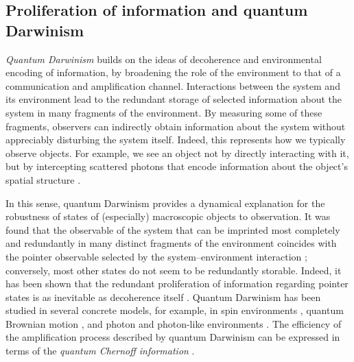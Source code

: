 \documentclass[aps,pra,reprint,amsmath,amssymb,showpacs,nofootinbib,floatfix,onecolumn,12pt]{revtex4-1}
\begin{document}
\subsection{\label{sec:prol-inform-quant}Proliferation of information and quantum Darwinism}

\emph{Quantum Darwinism} \cite{Zurek:2003:pl,Ollivier:2003:za,Ollivier:2004:im,Blume:2004:oo,Blume:2005:oo,Zurek:2009:om,Riedel:2010:un,Riedel:2011:un,Riedel:2012:un} builds on the ideas of decoherence and environmental encoding of information, by broadening the role of the environment to that of a communication and amplification channel. Interactions between the system and its environment lead to the redundant storage of selected information about the system in  many fragments of the environment. By measuring some of these fragments, observers can indirectly obtain information about the system without appreciably disturbing the system itself. Indeed, this represents how we typically observe objects. For example, we see an object not by directly interacting with it, but by intercepting scattered photons that encode information about the object's spatial structure \cite{Riedel:2010:un,Riedel:2011:un}. 

In this sense, quantum Darwinism provides a dynamical explanation for the robustness of states of (especially) macroscopic objects to observation. It was found that the observable of the system that can be imprinted most completely and redundantly in many distinct fragments of the environment coincides with the pointer observable selected by the system--environment interaction  \cite{Ollivier:2003:za,Ollivier:2004:im,Blume:2004:oo,Blume:2005:oo}; conversely, most other states do not seem to be redundantly storable. Indeed, it has been shown that the redundant proliferation of information regarding pointer states is as inevitable as decoherence itself \cite{Zwolak:2014:tt}. Quantum Darwinism has been studied in several concrete models, for example, in spin environments \cite{Blume:2004:oo}, quantum Brownian motion \cite{Blume:2007:oo}, and photon and photon-like environments \cite{Riedel:2010:un,Riedel:2011:un,Zwolak:2014:tt}. The efficiency of the amplification process described by quantum Darwinism can be expressed in terms of the \emph{quantum Chernoff information} \cite{Zwolak:2014:tt}.
\end{document}
